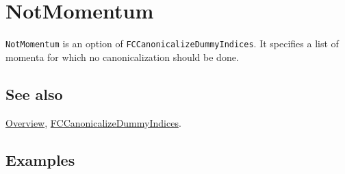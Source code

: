 \documentclass[../FeynCalcManual.tex]{subfiles}
\begin{document}
\hypertarget{notmomentum}{
\section{NotMomentum}\label{notmomentum}}

\texttt{NotMomentum} is an option of
\texttt{FCCanonicalizeDummyIndices}. It specifies a list of momenta for
which no canonicalization should be done.

\subsection{See also}

\hyperlink{toc}{Overview},
\hyperlink{fccanonicalizedummyindices}{FCCanonicalizeDummyIndices}.

\subsection{Examples}
\end{document}

